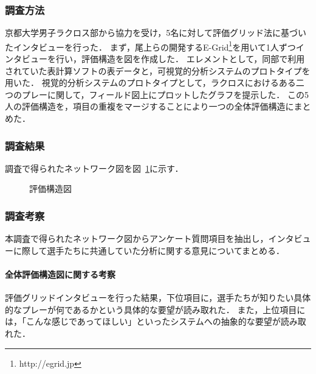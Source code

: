 \documentclass[sotsuron]{kuee}
\begin{document}
			\subsubsection{調査方法}
				京都大学男子ラクロス部から協力を受け，5名に対して評価グリッド法に基づいたインタビューを行った．
				まず，尾上らの開発するE-Grid\footnote{http://egrid.jp}を用いて1人ずつインタビューを行い，評価構造を図を作成した．
				エレメントとして，同部で利用されていた表計算ソフトの表データと，可視覚的分析システムのプロトタイプを用いた．
				視覚的分析システムのプロトタイプとして，ラクロスにおけるある二つのプレーに関して，フィールド図上にプロットしたグラフを提示した．
				この5人の評価構造を，項目の重複をマージすることにより一つの全体評価構造にまとめた．
			\subsubsection{調査結果}	
				調査で得られたネットワーク図を図~\ref{fig:egrid}に示す．
					\begin{figure}
						\begin{center}
						\end{center}
						\caption{評価構造図}
				  		\label{fig:egrid}
					\end{figure}
			\subsubsection{調査考察}
				本調査で得られたネットワーク図からアンケート質問項目を抽出し，インタビューに際して選手たちに共通していた分析に関する意見についてまとめる．
				\paragraph{全体評価構造図に関する考察}
					評価グリッドインタビューを行った結果，下位項目に，選手たちが知りたい具体的なプレーが何であるかという具体的な要望が読み取れた．
					また，上位項目には，「こんな感じであってほしい」といったシステムへの抽象的な要望が読み取れた．
\end{document}
